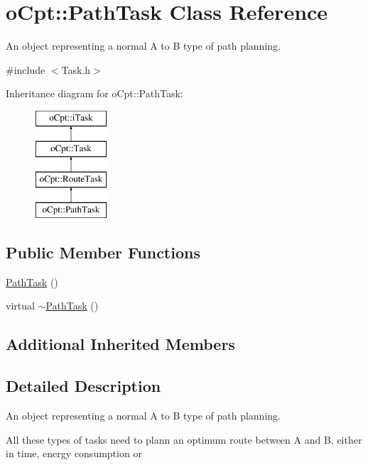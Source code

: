 \hypertarget{classo_cpt_1_1_path_task}{}\section{o\+Cpt\+:\+:Path\+Task Class Reference}
\label{classo_cpt_1_1_path_task}


An object representing a normal A to B type of path planning.  




{\ttfamily \#include $<$Task.\+h$>$}

Inheritance diagram for o\+Cpt\+:\+:Path\+Task\+:\begin{figure}[H]
\begin{center}
\leavevmode
\includegraphics[height=4.000000cm]{classo_cpt_1_1_path_task}
\end{center}
\end{figure}
\subsection*{Public Member Functions}
\begin{DoxyCompactItemize}
\item 
\hyperlink{classo_cpt_1_1_path_task_a6ff85543d0ecb0dedf8d9ade9f62cb7d}{Path\+Task} ()
\item 
virtual \hyperlink{classo_cpt_1_1_path_task_a957810982a8f94b7c0b942e348e86467}{$\sim$\+Path\+Task} ()
\end{DoxyCompactItemize}
\subsection*{Additional Inherited Members}


\subsection{Detailed Description}
An object representing a normal A to B type of path planning. 

All these types of tasks need to plann an optimum route between A and B, either in time, energy consumption or 

